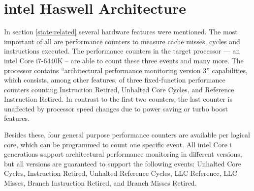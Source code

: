 \begin{comment}
\textbf{Fiasco.OC}
\begin{itemize}
  \item Kernel scheduler does no balancing, assigns thread to the first
    core specified in the affinity descriptor
  \item affinity descriptor: core(s) a thread should run on
  \item Syscall via run\_thread() to pass affinity descr to kernel scheduler
  \item interface to query execution time for each thread
  \item capability system -- to derive communication relationships from
  \item	Kernel feature wishes derived from related work: Performance counters
    and per thread accounting
\end{itemize}

\textbf{L4Re}
\begin{itemize}
  \item provides scheduler proxy interface, including affinity descriptor,
    scheduling parameters
  \item syscall interface
\end{itemize}
\end{comment}



\section{\gls{intel} Haswell Architecture}
\label{state:haswell}

In section \ref{state:related} several hardware features were mentioned.
The most important of all are performance counters to measure cache misses, cycles and
instructions executed.
The performance counters in the target processor --- an \gls{intel} Core
i7-6440K -- are able to count these three events and many more.
The processor contains ``architectural performance monitoring version 3''
capabilities, which consists, among other features, of three fixed-function
performance counters counting Instruction Retired, Unhalted Core Cycles, and
Reference Instruction Retired.
In contrast to the first two counters, the last counter is unaffected by
processor speed changes due to power saving or turbo boost features.

Besides these, four general purpose performance counters are available per
logical core, which can be programmed to count one specific event.
All \gls{intel} Core i generations support architectural performance monitoring
in different versions, but all versions are guaranteed to support the following
events:
Unhalted Core Cycles, Instruction Retired, Unhalted Reference Cycles,
LLC Reference, LLC Misses, Branch Instruction Retired,
and Branch Misses Retired.


